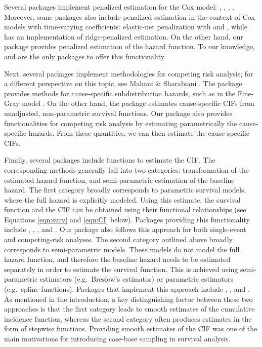 \documentclass[
]{jss}
\begin{document}
Several packages implement penalized estimation for the Cox model:
 \citeyearpar{regpathcox}, 
\citeyearpar{park_hastie},  \citeyearpar{l1penal},
 \citeyearpar{gerds_blanche}. Moreover, some
packages also include penalized estimation in the context of Cox models
with time-varying coefficients: elastic-net penalization with
 \citeyearpar{perperoglou} and 
\citeyearpar{clements_liu}, while 
\citeyearpar{survival-package} has an implementation of ridge-penalized
estimation. On the other hand, our package  provides
penalized estimation of the hazard function. To our knowledge,
 and  are the only packages to offer this
functionality.

Next, several  packages implement methodologies for
competing risk analysis; for a different perspective on this topic, see
Mahani \& Sharabiani \citeyearpar{mahani2015bayesian}. The package
 provides methods for cause-specific subdistribution
hazards, such as in the Fine-Gray model
\citeyearpar{fine1999proportional}. On the other hand, the package
 estimates cause-specific CIFs from unadjusted, non-parametric
survival functions. Our package  also provides
functionalities for competing risk analysis by estimating parametrically
the cause-specific hazards. From these quantities, we can then estimate
the cause-specific CIFs.

Finally, several packages include functions to estimate the CIF. The
corresponding methods generally fall into two categories: transformation
of the estimated hazard function, and semi-parametric estimation of the
baseline hazard. The first category broadly corresponds to parametric
survival models, where the full hazard is explicitly modeled. Using this
estimate, the survival function and the CIF can be obtained using their
functional relationships (see Equations \ref{eqn:surv} and \ref{eqn:CI}
below). Packages providing this functionality include ,
, , and . Our package
 also follows this approach for both single-event and
competing-risk analyses. The second category outlined above broadly
corresponds to semi-parametric models. These models do not model the
full hazard function, and therefore the baseline hazard needs to be
estimated separately in order to estimate the survival function. This is
achieved using semi-parametric estimators (e.g.~Breslow's estimator) or
parametric estimators (e.g.~spline functions). Packages that implement
this approach include , , and
. As mentioned in the introduction, a key distinguishing
factor between these two approaches is that the first category leads to
smooth estimates of the cumulative incidence function, whereas the
second category often produces estimates in the form of stepwise
functions. Providing smooth estimates of the CIF was one of the main
motivations for introducing case-base sampling in survival analysis.
\end{document}
